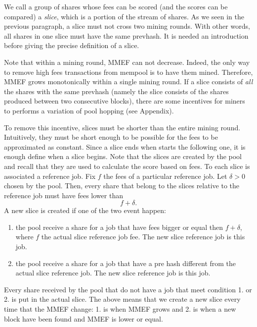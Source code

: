 \documentclass[11pt]{article} %
\begin{document}
We call a group of shares whose fees can be scored (and the scores can be compared) a \emph{slice}, which is a portion of the stream of shares. As we seen in the previous paragraph, a slice must not cross two mining rounds. With other words, all shares in one slice must have the same prevhash. It is needed an introduction before giving the precise definition of a slice.

Note that within a mining round, MMEF can not decrease. Indeed,  the only way to remove high fees transactions from mempool is to have them mined. Therefore, MMEF grows monotonically within a single mining round. If a slice consists of \emph{all} the shares with the same prevhash (namely the slice consists of the shares produced between two consecutive blocks), there are some incentives for miners to performs a variation of pool hopping (see Appendix).

\begin{comment}
In order to pay fairly shares taking in consideration fees, it is appriopriate to compare shares relative to the same round of mining. Indeed, it is difficult to find a tool capable of scoring two shares produced in two moment in which the mempool differs consistently. So, we can only compare shares with the same prevhash.


The above system do not account for the fact that the mempool maximum extractable fees (MMEF) change, and grows monotonically between block n and block n+1. This can be verified empirically, to notethat between 2 block MMEF can not decrease cause the only way to remove high fees transactions
from mempool is to put them in a block. This give an incentive to the miners to do pool hopping (TODO).
\end{comment}

To remove this incentive, slices must be shorter than the entire mining round. Intuitively, they must be short enough to be possible for the fees to be approximated as constant. Since a slice ends when starts the following one, it is enough define when a slice begins. Note that the slices are created by the pool and recall that they are used to calculate the score based on fees. To each slice is associated a reference job. Fix $f$ the fees of a particular reference job. Let $\delta>0$ chosen by the pool. Then, every share that belong to the slices relative to the reference job must have fees lower than
\[ f+\delta.\]
A new slice is created if one of the two event happen:
\begin{enumerate}
	\item the pool receive a share for a job that have fees bigger or equal then $f+\delta$, where $f$ the actual slice reference job fee. The new slice reference job is this job.
	\item the pool receive a share for a job that have a pre hash different from the actual slice reference job. The new slice reference job is this job.
\end{enumerate}
Every share received by the pool that do not have a job that meet condition 1. or 2. is put in the actual slice. The above means that we create a new slice every time that the MMEF change: 1. is when MMEF grows and 2. is when a new block have been found and MMEF is lower or equal.
\end{document}
